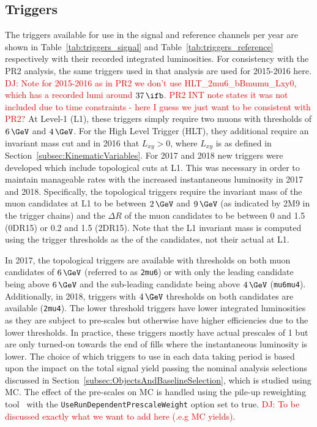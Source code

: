 \subsection{Triggers}
\label{subsec:Triggers}

The triggers available for use in the signal and reference channels per year are shown in Table~\ref{tab:triggers_signal} and Table~\ref{tab:triggers_reference} respectively with their recorded integrated luminosities. 
For consistency with the PR2 analysis, the same triggers used in that analysis are used for 2015-2016 here. 
\textcolor{red}{DJ: Note for 2015-2016 as in PR2 we don't use HLT\_2mu6\_bBmumu\_Lxy0, which has a recorded lumi around $37\,\ifb$. PR2 INT note states it was not included due to time constraints - here I guess we just want to be consistent with PR2?}
At Level-1 (L1), these triggers simply require two muons with \pT thresholds of $6\,\GeV$ and $4\,\GeV$. 
For the High Level Trigger (HLT), they additional require an invariant mass cut and in 2016 that $L_{xy} > 0$, where $L_{xy}$ is as defined in Section~\ref{subsec:KinematicVariables}. 
For 2017 and 2018 new triggers were developed which include topological cuts at L1. 
This was necessary in order to maintain manageable rates with the increased instantaneous luminosity in 2017 and 2018.
Specifically, the topological triggers require the invariant mass of the muon candidates at L1 to be between $2\,\GeV$ and $9\,\GeV$ (as indicated by 2M9 in the trigger chains) and the $\Delta R$ of the muon candidates to be between 0 and 1.5 (0DR15) or 0.2 and 1.5 (2DR15). 
Note that the L1 invariant mass is computed using the \pT trigger thresholds as the \pT of the candidates, not their actual \pT at L1.

In 2017, the topological triggers are available with \pT thresholds on both muon candidates of $6\,\GeV$ (referred to as \verb|2mu6|) or with only the leading candidate \pT being above $6\,\GeV$ and the sub-leading candidate \pT being above $4\,\GeV$ (\verb|mu6mu4|). 
Additionally, in 2018, triggers with $4\,\GeV$ \pT thresholds on both candidates are available (\verb|2mu4|). 
The lower \pT threshold triggers have lower integrated luminosities as they are subject to pre-scales but otherwise have higher efficiencies due to the lower thresholds.
In practice, these triggers mostly have actual prescales of 1 but are only turned-on towards the end of fills where the instantaneous luminosity is lower. 
The choice of which triggers to use in each data taking period is based upon the impact on the total signal yield passing the nominal analysis selections discussed in Section~\ref{subsec:ObjectsAndBaselineSelection}, which is studied using MC.  
The effect of the pre-scales on MC is handled using the pile-up reweighting tool~\cite{Buttinger:2014726} with the \verb|UseRunDependentPrescaleWeight| option set to true. 
\textcolor{red}{DJ: To be discussed exactly what we want to add here (.e.g MC yields).} 


